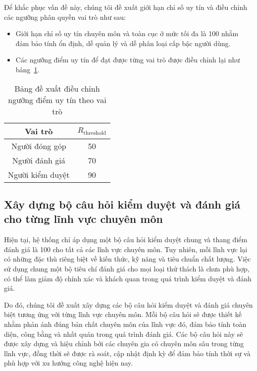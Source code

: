 Để khắc phục vấn đề này, chúng tôi đề xuất giới hạn chỉ số uy tín và điều chỉnh các ngưỡng phân quyền vai trò như sau:
\begin{itemize}
  \item Giới hạn chỉ số uy tín chuyên môn và toàn cục ở mức tối đa là 100 nhằm đảm bảo tính ổn định, dễ quản lý và dễ phân loại cấp bậc người dùng.
  \item Các ngưỡng điểm uy tín để đạt được từng vai trò được điều chỉnh lại như bảng~\ref{tab:suggested-role-reputation-threshold-adjustment}.
\end{itemize}

\begin{table}[H]
  \centering
  \begin{tabular}{|c|c|}
    \hline
    \textbf{Vai trò} & $R_{\text{threshold}}$ \\ \hline
    Người đóng góp   & 50                     \\ \hline
    Người đánh giá   & 70                     \\ \hline
    Người kiểm duyệt & 90                     \\ \hline
  \end{tabular}
  \caption{Bảng đề xuất điều chỉnh ngưỡng điểm uy tín theo vai trò}
  \label{tab:suggested-role-reputation-threshold-adjustment}
\end{table}

\subsection{Xây dựng bộ câu hỏi kiểm duyệt và đánh giá cho từng lĩnh vực chuyên môn}

Hiện tại, hệ thống chỉ áp dụng một bộ câu hỏi kiểm duyệt chung và thang điểm đánh giá là 100 cho tất cả các lĩnh vực chuyên môn. Tuy nhiên, mỗi lĩnh vực lại có những đặc thù riêng biệt về kiến thức, kỹ năng và tiêu chuẩn chất lượng.
Việc sử dụng chung một bộ tiêu chí đánh giá cho mọi loại thử thách là chưa phù hợp, có thể làm giảm độ chính xác và khách quan trong quá trình kiểm duyệt và đánh giá.

Do đó, chúng tôi đề xuất xây dựng các bộ câu hỏi kiểm duyệt và đánh giá chuyên biệt tương ứng với từng lĩnh vực chuyên môn. Mỗi bộ câu hỏi sẽ được thiết kế nhằm phản ánh đúng bản chất chuyên môn của lĩnh vực đó, đảm bảo tính toàn diện, công bằng và nhất quán trong quá trình đánh giá.
Các bộ câu hỏi này sẽ được xây dựng và hiệu chỉnh bởi các chuyên gia có chuyên môn sâu trong từng lĩnh vực, đồng thời sẽ được rà soát, cập nhật định kỳ để đảm bảo tính thời sự và phù hợp với xu hướng công nghệ hiện nay.


